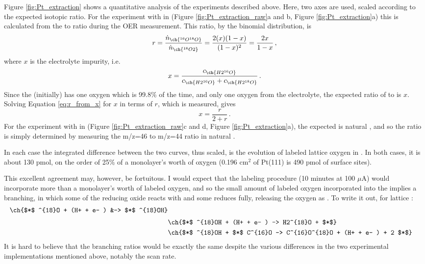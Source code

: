 Figure \ref{fig:Pt_extraction} shows a quantitative analysis of the experiments described above. Here, two axes are used, scaled according to the expected isotopic ratio. For the experiment with  in  (Figure \ref{fig:Pt_extraction_raw}a and b, Figure \ref{fig:Pt_extraction}a) this is calculated from the  to  ratio during the OER measurement. This ratio, by the binomial distribution, is
\begin{equation}
r = \frac{\dot{n}_{\ch{^{16}O^{18}O}}}{\dot{n}_{\ch{^{18}O2}}} = \frac{2(x)(1-x)}{(1-x)^2} = \frac{2x}{1-x}\,,\label{eq:r_from_x}
\end{equation}
where $x$ is the electrolyte impurity, i.e.
\begin{equation}
x = \frac{c_{\ch{H2^{16}O}}}{c_{\ch{H2^{16}O}} + c_{\ch{H2^{18}O}}}\,.
\end{equation}
Since the  (initially) has one oxygen which is  99.8\% of the time, and only one oxygen from the electrolyte, the expected ratio of  to  is $x$. Solving Equation \ref{eq:r_from_x} for $x$ in terms of $r$, which is measured, gives
\begin{equation}
x = \frac{r}{2+r}\,.
\end{equation}
For the experiment with  in  (Figure \ref{fig:Pt_extraction_raw}c and d, Figure \ref{fig:Pt_extraction}a), the expected  is natural , and so the ratio is simply determined by measuring the m/z=46 to m/z=44 ratio in natural .

In each case the integrated difference between the two curves, thus scaled, is the evolution of labeled lattice oxygen in . In both cases, it is about 130 pmol, on the order of 25\% of a monolayer's worth of oxygen (0.196 cm$^2$ of Pt(111) is 490 pmol of surface sites). 

This excellent agreement may, however, be fortuitous. I would expect that the labeling procedure (10 minutes at 100 $\mu$A) would incorporate more than a monolayer's worth of labeled oxygen, and so the small amount of labeled oxygen incorporated into the  implies a branching, in which some of the reducing oxide reacts with  and some reduces fully, releasing the oxygen as . To write it out, for lattice :
\begin{align}
\ch{$*$ ^{18}O + (H+ + e- ) &-> $*$ ^{18}OH}\Bstrut\\
&\ch{$*$ ^{18}OH + (H+ + e- ) -> H2^{18}O + $*$}\\
&\ch{$*$ ^{18}OH + $*$ C^{16}O -> C^{16}O^{18}O + (H+ + e- ) + 2 $*$}
\end{align}
It is hard to believe that the branching ratios would be exactly the same despite the various differences in the two experimental implementations mentioned above, notably the scan rate. 

